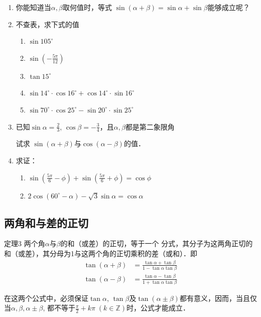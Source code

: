 \begin{ex}
\begin{enumerate}
    \item 你能知道当$\alpha,\beta$取何值时，等式
    $\sin(\alpha+\beta)=\sin\alpha+\sin\beta$能够成立呢？
\item 不查表，求下式的值
\begin{enumerate}
    \item $\sin 105^{\circ}$
    \item $\sin\left(-\frac{5\pi}{12}\right)$
    \item $\tan 15^{\circ}$
    \item $\sin 14^{\circ}\cdot \cos 16^{\circ}+\cos 14^{\circ}\cdot \sin 16^{\circ}$
    \item $\sin 70^{\circ}\cdot \cos 25^{\circ}-\sin 20^{\circ}\cdot \sin 25^{\circ}$
\end{enumerate}
\item 已知$\sin\alpha=\frac{2}{3}$, $\cos\beta=-\frac{3}{4}$，且$\alpha,\beta$都是第二象限角

试求
$\sin(\alpha+\beta)$与$\cos(\alpha-\beta)$的值．
\item 求证：
\begin{enumerate}
    \item $\sin\left(\frac{5\pi}{6}-\phi\right)+\sin\left(\frac{5\pi}{6}+\phi\right)=\cos\phi$
    \item $2\cos(60^{\circ}-\alpha)-\sqrt{3}\sin\alpha=\cos\alpha$
\end{enumerate}
\end{enumerate}
\end{ex}

\subsection{两角和与差的正切}
\begin{blk}{定理3}
    两个角$\alpha$与$\beta$的和（或差）的正切，等于一个
分式，其分子为这两角正切的和（或差），其分母为1与这两个角的正切乘积的差（或和）．即
\begin{align}
    \tan(\alpha+\beta)&=\frac{\tan\alpha+\tan\beta}{1-\tan\alpha\tan\beta}\\
    \tan(\alpha-\beta)&=\frac{\tan\alpha-\tan\beta}{1+\tan\alpha\tan\beta}
\end{align}
\end{blk}

\begin{rmk}
    在这两个公式中，必须保证$\tan\alpha$, $\tan\beta$及$\tan(\alpha\pm\beta)$都有意义，因而，当且仅当$\alpha,\beta,\alpha\pm\beta$, 都不等于$\frac{\pi}{2}+k\pi\; (k\in\mathbb{Z})$时，公式才能成立．
\end{rmk}

